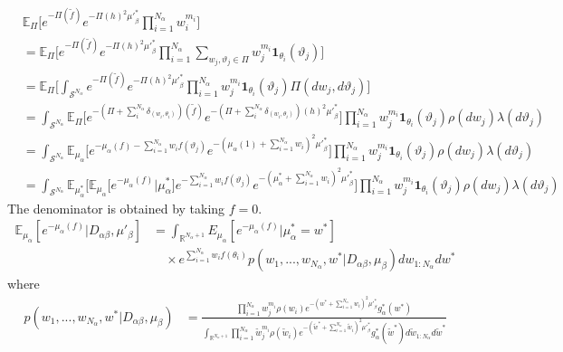 \documentclass{article}
\begin{document}
\begin{align}
&\mathbb{E}_{\Pi}\Big[e^{-\Pi(\tilde{f})} e^{-\Pi(h)^2{\mu'}_\beta^{*}} \prod_{i=1}^{N_\alpha} w_i^{m_i} \Big] &\\
&= \mathbb{E}_{\Pi}\Big[e^{-\Pi(\tilde{f})} e^{-\Pi(h)^2{\mu'}_\beta^{*}} \prod_{i=1}^{N_\alpha} \sum_{w_j, \vartheta_j \in \Pi} w_j^{m_i} \mathbf{1}_{\theta_i}(\vartheta_j)\Big]& \\
&= \mathbb{E}_{\Pi}\Big[\int_{\mathcal{S}^{N_\alpha}} e^{-\Pi(\tilde{f})} e^{-\Pi(h)^2{\mu'}_\beta^{*}}  \prod_{i=1}^{N_\alpha} w_j^{m_i} \mathbf{1}_{\theta_i}(\vartheta_j) \Pi(dw_j, d\vartheta_j)\Big]& \\
&=  \int_{\mathcal{S}^{N_\alpha}} \mathbb{E}_{\Pi}\Big[ e^{-(\Pi+\sum_i^{N_\alpha}\delta_{(w_i, \theta_i)})(\tilde{f})} e^{-(\Pi+\sum_i^{N_\alpha}\delta_{(w_i, \theta_i)})(h)^2{\mu'}_\beta^{*}}\Big] \prod_{i=1}^{N_\alpha} w_j^{m_i} \mathbf{1}_{\theta_i}(\vartheta_j) \rho(dw_j)\lambda(d\vartheta_j) & \\
&=  \int_{\mathcal{S}^{N_\alpha}} \mathbb{E}_{\mu_\alpha}\Big[ e^{-\mu_\alpha(f) - \sum_{i=1}^{N_\alpha}w_if(\vartheta_j)} e^{-(\mu_\alpha(1) + \sum_{i=1}^{N_\alpha} w_i)^2{\mu'}_\beta^{*}}\Big] \prod_{i=1}^{N_\alpha} w_j^{m_i} \mathbf{1}_{\theta_i}(\vartheta_j) \rho(dw_j)\lambda(d\vartheta_j) &\\
&=  \int_{\mathcal{S}^{N_\alpha}} \mathbb{E}_{\mu_\alpha^*}\bigg[ \mathbb{E}_{\mu_\alpha} \Big[e^{-\mu_\alpha(f)}|\mu_\alpha^* \Big] e^{- \sum_{i=1}^{N_\alpha}w_if(\vartheta_j)} e^{-(\mu_\alpha^* + \sum_{i=1}^{N_\alpha} w_i)^2{\mu'}_\beta^{*}}\bigg] \prod_{i=1}^{N_\alpha} w_j^{m_i} \mathbf{1}_{\theta_i}(\vartheta_j) \rho(dw_j)\lambda(d\vartheta_j) &
\end{align}
The denominator is obtained by taking $f=0$.
\begin{align}
\mathbb{E}_{\mu_\alpha}[e^{-\mu_\alpha(f)}|D_{\alpha\beta}, \mu'_\beta] &= \int_{\mathbb{R}^{N_\alpha + 1}} E_{\mu_\alpha}[e^{-\mu_\alpha(f)}|\mu_\alpha^* = w^*]\\
&\quad \times e^{\sum_{i=1}^{N_\alpha}w_i f(\theta_i)} p(w_1, ..., w_{N_\alpha}, w^*|D_{\alpha\beta}, \mu_\beta) dw_{1:N_\alpha}dw^*
\end{align}
where
\begin{align}
p(w_1, ..., w_{N_\alpha}, w^*|D_{\alpha\beta}, \mu_\beta)&
= \frac{\prod_{i=1}^{N_\alpha} w_j^{m_i} \rho(w_i) e^{-(w^* + \sum_{i=1}^{N_\alpha} w_i)^2{\mu'}_\beta^{*}} g^*_\alpha(w^*)}
{\int_{\mathbb{R}^{N_\alpha + 1}}\prod_{i=1}^{N_\alpha} \tilde{w}_j^{m_i} \rho(\tilde{w}_i) e^{-(\tilde{w}^* + \sum_{i=1}^{N_\alpha} \tilde{w}_i)^2{\mu'}_\beta^{*}} g^*_\alpha(\tilde{w}^*) d\tilde{w}_{1:N_\alpha}d\tilde{w}^*}\\
\end{align}
\end{document}
